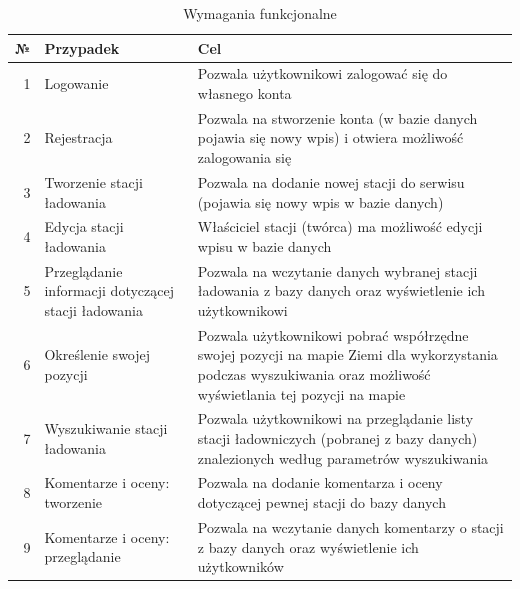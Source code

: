 \begin{table}[htb] \small
\centering
    \caption{Wymagania funkcjonalne}
    \label{tab:wymaganiafunkcjonalne}
    \begin{tabularx}{\linewidth}{| r | p{4.5cm} | X |} 
    \hline
    № & Przypadek & Cel \\
    \hline
    1 & Logowanie & Pozwala użytkownikowi zalogować się do własnego konta \\ 
    \hline
    2 & Rejestracja & Pozwala na stworzenie konta (w bazie danych pojawia się nowy wpis) i otwiera możliwość zalogowania się \\ 
    \hline
    3 & Tworzenie stacji ładowania & Pozwala na dodanie nowej stacji do serwisu (pojawia się nowy wpis w bazie danych) \\
    \hline
    4 & Edycja stacji ładowania & Właściciel stacji (twórca) ma możliwość edycji wpisu w bazie danych \\
    \hline
    5 & Przeglądanie informacji dotyczącej stacji ładowania & Pozwala na wczytanie danych wybranej stacji ładowania z bazy danych oraz wyświetlenie ich użytkownikowi \\
    \hline
    6 & Określenie swojej pozycji & Pozwala użytkownikowi pobrać współrzędne swojej pozycji na mapie Ziemi dla wykorzystania podczas wyszukiwania oraz możliwość wyświetlania tej pozycji na mapie \\
    \hline
    7 & Wyszukiwanie stacji ładowania & Pozwala użytkownikowi na przeglądanie listy stacji ładowniczych (pobranej z bazy danych) znalezionych według parametrów wyszukiwania \\
    \hline
    8 & Komentarze i oceny: tworzenie  & Pozwala na dodanie komentarza i oceny dotyczącej pewnej stacji do bazy danych \\
    \hline
    9 & Komentarze i oceny: przeglądanie  & Pozwala na wczytanie danych komentarzy o stacji z bazy danych oraz wyświetlenie ich użytkowników \\
    \hline
\end{tabularx}
\end{table}


